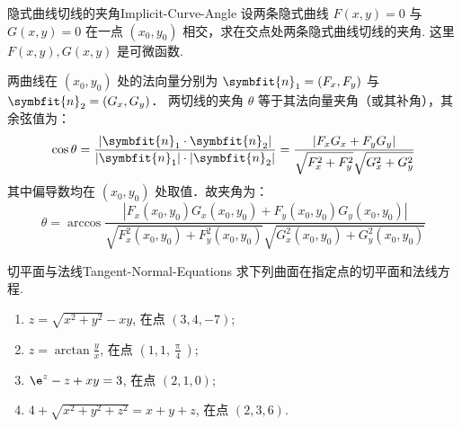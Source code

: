 \begin{problem}{隐式曲线切线的夹角}{Implicit-Curve-Angle}
    设两条隐式曲线 $F(x, y) = 0$ 与 $G(x, y) = 0$ 在一点 $(x_0, y_0)$ 相交，求在交点处两条隐式曲线切线的夹角. 这里 $F(x, y), G(x, y)$ 是可微函数.
\end{problem}

\begin{solution}
    两曲线在 $(x_0, y_0)$ 处的法向量分别为 $\symbfit{n}_1 = (F_x, F_y)$ 与 $\symbfit{n}_2 = (G_x, G_y)$．
    两切线的夹角 $\theta$ 等于其法向量夹角（或其补角），其余弦值为：
    \begin{equation}
        \cos \theta = \frac{|\symbfit{n}_1 \cdot \symbfit{n}_2|}{|\symbfit{n}_1| \cdot |\symbfit{n}_2|} = \frac{|F_x G_x + F_y G_y|}{\sqrt{F_x^2 + F_y^2} \sqrt{G_x^2 + G_y^2}}
    \end{equation}
    其中偏导数均在 $(x_0, y_0)$ 处取值．故夹角为：
    \begin{equation}
        \boxed{\theta = \arccos \frac{|F_x(x_0, y_0) G_x(x_0, y_0) + F_y(x_0, y_0) G_y(x_0, y_0)|}{\sqrt{F_x^2(x_0, y_0) + F_y^2(x_0, y_0)} \sqrt{G_x^2(x_0, y_0) + G_y^2(x_0, y_0)}}}
    \end{equation}
\end{solution}


\begin{problem}{切平面与法线}{Tangent-Normal-Equations}
    求下列曲面在指定点的切平面和法线方程.
    \begin{enumerate}
        \item $z = \sqrt{x^2 + y^2} - xy$, 在点 $(3, 4, -7)$;
        \item $z = \arctan \frac{y}{x}$, 在点 $(1, 1, \frac{\uppi}{4})$;
        \item $\e^z - z + xy = 3$, 在点 $(2, 1, 0)$;
        \item $4 + \sqrt{x^2 + y^2 + z^2} = x + y + z$, 在点 $(2, 3, 6)$.
    \end{enumerate}
\end{problem}

